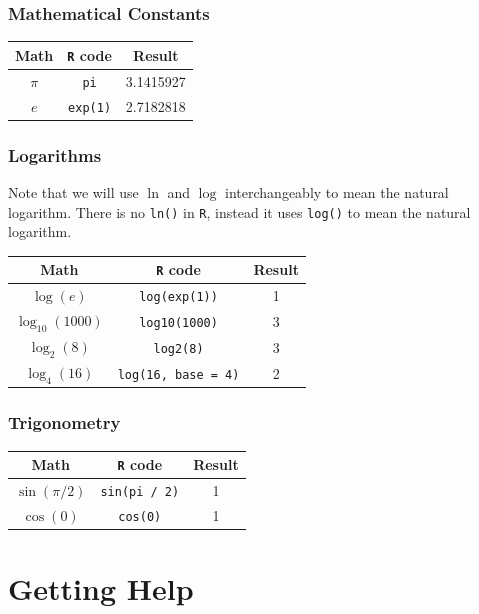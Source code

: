 \documentclass[]{book}
\theoremstyle{definition}
\theoremstyle{definition}
\theoremstyle{definition}
\theoremstyle{remark}
\begin{document}
\subsubsection*{Mathematical Constants}\label{mathematical-constants}

\begin{longtable}[]{@{}ccc@{}}
\toprule
Math & \texttt{R} code & Result\tabularnewline
\midrule
\endhead
\(\pi\) & \texttt{pi} & 3.1415927\tabularnewline
\(e\) & \texttt{exp(1)} & 2.7182818\tabularnewline
\bottomrule
\end{longtable}

\subsubsection*{Logarithms}\label{logarithms}

Note that we will use \(\ln\) and \(\log\) interchangeably to mean the
natural logarithm. There is no \texttt{ln()} in \texttt{R}, instead it
uses \texttt{log()} to mean the natural logarithm.

\begin{longtable}[]{@{}ccc@{}}
\toprule
Math & \texttt{R} code & Result\tabularnewline
\midrule
\endhead
\(\log(e)\) & \texttt{log(exp(1))} & 1\tabularnewline
\(\log_{10}(1000)\) & \texttt{log10(1000)} & 3\tabularnewline
\(\log_{2}(8)\) & \texttt{log2(8)} & 3\tabularnewline
\(\log_{4}(16)\) & \texttt{log(16,\ base\ =\ 4)} & 2\tabularnewline
\bottomrule
\end{longtable}

\subsubsection*{Trigonometry}\label{trigonometry}

\begin{longtable}[]{@{}ccc@{}}
\toprule
Math & \texttt{R} code & Result\tabularnewline
\midrule
\endhead
\(\sin(\pi / 2)\) & \texttt{sin(pi\ /\ 2)} & 1\tabularnewline
\(\cos(0)\) & \texttt{cos(0)} & 1\tabularnewline
\bottomrule
\end{longtable}

\section{Getting Help}\label{getting-help}
\end{document}

